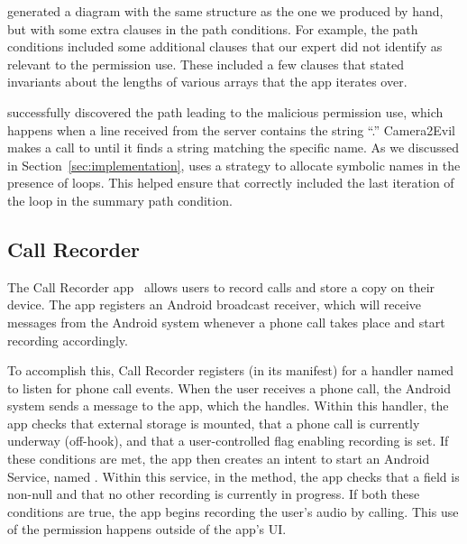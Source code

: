 \hogarth{} generated a diagram with the same structure as 
the one we produced by hand, but with some extra clauses in the path conditions.
For example, the \hogarth{} path conditions included some additional clauses 
that our expert did not identify as relevant to the permission use. 
These included a few clauses that stated
invariants about the lengths of various arrays that the app iterates over.

\hogarth{} successfully discovered the path leading to the malicious
permission use, which happens when a line received from the server
contains the string ``.'' Camera2Evil makes a call to
 until it finds a string matching the
specific name. As we discussed in Section~\ref{sec:implementation},
\hogarth{} uses a strategy to
allocate symbolic names in the presence of loops. This helped ensure
that \hogarth{} correctly included the last iteration of the loop in
the summary path condition.

\subsection{Call Recorder}
%
%
The Call Recorder app~\cite{callrecorder} allows users to record calls and store a copy on
their device. The app registers an Android broadcast
receiver\cite{broadcast}, which will receive messages from the Android
system whenever a phone call takes place and start recording accordingly.

To accomplish this, Call Recorder registers (in its manifest) for 
a handler named  to listen for 
phone call events. When the user receives a phone call, the Android 
system sends a message to the app, which the  handles. 
Within this handler, the app checks that external storage is mounted, that 
a phone call is currently underway (off-hook), and that a user-controlled flag
enabling recording is set. If these conditions are met, the app then creates 
an intent to start an Android Service, named . Within this 
service, in the  method, the app checks 
that a  field is non-null and that no other recording is 
currently in progress. If both these conditions are true, the app begins recording 
the user's audio by calling. This use of the 
 permission happens outside of the app's UI.

